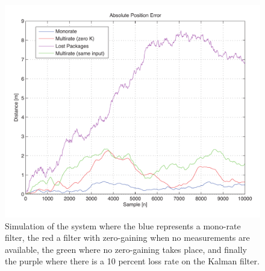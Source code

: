 \documentclass[a0,portrait]{a0poster}
\begin{document}
\begin{center}
{\begin{figure}
	\centering %
	\includegraphics[size=\textwidth]{img/10percent}
  	\caption{Simulation of the system where the blue represents a mono-rate filter, the red a filter with zero-gaining when no measurements are available, the green where no zero-gaining takes place, and finally the purple where there is a 10 percent loss rate on the Kalman filter.}
	\label{fig:trends}
\end{figure}
}
\end{center}

\makefooter
\end{document}
